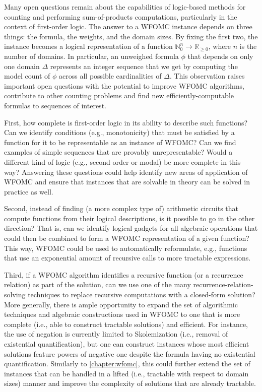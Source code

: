 Many open questions remain about the capabilities of logic-based methods for counting and performing sum-of-products computations, particularly in the context of first-order logic. The answer to a WFOMC instance depends on three things: the formula, the weights, and the domain sizes. By fixing the first two, the instance becomes a logical representation of a function $\mathbb{N}_0^n \to \mathbb{R}_{\ge 0}$, where $n$ is the number of domains. In particular, an unweighed formula $\phi$ that depends on only one domain $\Delta$ represents an integer sequence that we get by computing the model count of $\phi$ across all possible cardinalities of $\Delta$. This observation raises important open questions with the potential to improve WFOMC algorithms, contribute to other counting problems and find new efficiently-computable formulas to sequences of interest.

First, how complete is first-order logic in its ability to describe such functions? Can we identify conditions (e.g., monotonicity) that must be satisfied by a function for it to be representable as an instance of WFOMC? Can we find examples of simple sequences that are provably unrepresentable? Would a different kind of logic (e.g., second-order or modal) be more complete in this way? Answering these questions could help identify new areas of application of WFOMC and ensure that instances that are solvable in theory can be solved in practice as well.

Second, instead of finding (a more complex type of) arithmetic circuits that compute functions from their logical descriptions, is it possible to go in the other direction? That is, can we identify logical gadgets for all algebraic operations that could then be combined to form a WFOMC representation of a given function? This way, WFOMC could be used to automatically reformulate, e.g., functions that use an exponential amount of recursive calls to more tractable expressions.

Third, if a WFOMC algorithm identifies a recursive function (or a recurrence relation) as part of the solution, can we use one of the many recurrence-relation-solving techniques to replace recursive computations with a closed-form solution? More generally, there is ample opportunity to expand the set of algorithmic techniques and algebraic constructions used in WFOMC to one that is more complete (i.e., able to construct tractable solutions) and efficient. For instance, the use of negation is currently limited to Skolemization (i.e., removal of existential quantification), but one can construct instances whose most efficient solutions feature powers of negative one despite the formula having no existential quantification. Similarly to \cref{chapter:wfomc}, this could further extend the set of instances that can be handled in a lifted (i.e., tractable with respect to domain sizes) manner and improve the complexity of solutions that are already tractable.
